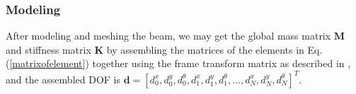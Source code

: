 \documentclass[conference, onecolumn]{IEEEtran}
\begin{document}
\subsubsection{Modeling}
\label{subsection_modeling}




%

After modeling and meshing the beam, we may get the global mass matrix $\mathbf{M}$ and stiffness matrix $\mathbf{K}$ by assembling the matrices of the elements in Eq.(\ref{matrixofelement}) together using the frame transform matrix as described in \cite{Reddy2019}, and the assembled DOF is $\boldsymbol{d}=[d^x_0,d^y_0,d^\theta_0,d^x_1,d^y_1,d^\theta_1,...,d^x_N,d^y_N,d^\theta_N]^T$.
\end{document}

